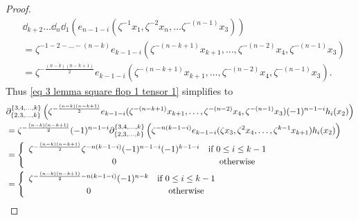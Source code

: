 \begin{proof}
       \begin{align}
       \nonumber &\dd_{k+2}\ldots \dd_n \dd_1 (e_{n-1-i}(\zeta^{-1}x_1, \zeta^{-2}x_n, \ldots \zeta^{-(n-1)}x_3))\\ \nonumber
       & = \zeta^{-1-2-\ldots -(n-k)} e_{k-1-i}(\zeta^{-(n-k+1)}x_{k+1}, \ldots, \zeta^{-(n-2)}x_4, \zeta^{-(n-1)}x_3) \\ 
        &= \zeta^{-\frac{(n-k)(n-k+1)}{2}}e_{k-1-i}(\zeta^{-(n-k+1)}x_{k+1}, \ldots, \zeta^{-(n-2)}x_4, \zeta^{-(n-1)}x_3). \label{eq left tensor factor square flop}
    \end{align}
    Thus \eqref{eq 3 lemma square flop 1 tensor 1} simplifies to
    \begin{align}
    \notag  &\partial^{\{3,4, \ldots, k\}}_{\{2, 3, \ldots, k\}} \left(
     \zeta^{-\frac{(n-k)(n-k+1)}{2}}e_{k-1-i}(\zeta^{-(n-k+1)}x_{k+1}, \ldots, \zeta^{-(n-2)}x_4, \zeta^{-(n-1)}x_3)
    (-1)^{n-1-i}h_i(x_2)  
    \right) \\
    \notag&=\zeta^{-\frac{(n-k)(n-k+1)}{2}} (-1)^{n-1-i} \partial^{\{3,4, \ldots, k\}}_{\{2, 3, \ldots, k\}} \left( \zeta^{-n(k-1-i)}e_{k-1-i}(\zeta x_3, \zeta^2 x_4, \ldots, \zeta^{k-1}x_{k+1})h_i(x_2)
    \right)\\
    &= \begin{cases}
    \begin{array}{cc}
    \zeta^{-\frac{(n-k)(n-k+1)}{2}}\zeta^{-n(k-1-i)} (-1)^{n-1-i} (-1)^{k-1-i}  &\text{if $0\leq i \leq k-1$} \\
    0  &\text{otherwise} 
    \end{array}
    \end{cases} \label{eq 4 lemma square flop 1 tensor 1}\\
    &=\begin{cases}
    \begin{array}{cc}
    \zeta^{-\frac{(n-k)(n-k+1)}{2}-n(k-1-i)} (-1)^{n-k}  &\text{if $0\leq i \leq k-1$}\\
    0  &\text{otherwise}
    \end{array}

\end{cases}
\end{align}
\end{proof}
